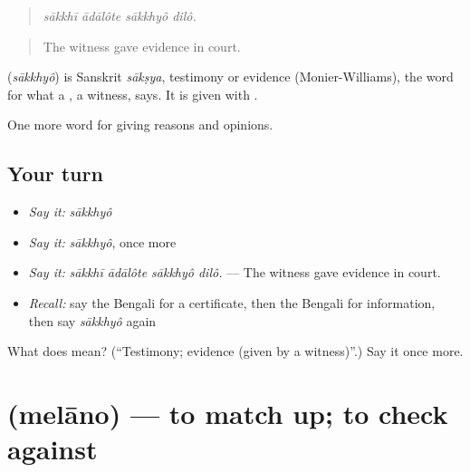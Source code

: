 \begin{quote}
   
\end{quote}

\begin{quote}
\emph{sākkhī ādālôte sākkhyô dilô.}
\end{quote}

\begin{quote}
The witness gave evidence in court.
\end{quote}

\begin{cousinweb}
\textbf{} (\emph{sākkhyô}) is Sanskrit \emph{sākṣya}, testimony or evidence (Monier-Williams), the word for what a , a witness, says. It is given with .
\end{cousinweb}

\begin{grammarlens}[title={What you've built}]
One more word for giving reasons and opinions.
\end{grammarlens}

\subsection*{Your turn}
\begin{itemize}
\raggedright
  \item \emph{Say it:} \emph{sākkhyô}
  \item \emph{Say it:} \emph{sākkhyô}, once more
  \item \emph{Say it:} \emph{sākkhī ādālôte sākkhyô dilô.} — The witness gave evidence in court.
  \item \emph{Recall:} say the Bengali for a certificate, then the Bengali for information, then say \emph{sākkhyô} again
\end{itemize}

\begin{tcolorbox}[breakable,colback=teal!4,colframe=teal!35!black,title={Before you move on}]
What does  mean? (\textquotedblleft{}Testimony; evidence (given by a witness)\textquotedblright{}.) Say it once more.
\end{tcolorbox}
\section[\texorpdfstring{\bn{মেলানো} (melāno)}{মেলানো (melāno)}]{ (melāno) — to match up; to check against}

\label{lesson:BN-C338-melano}



